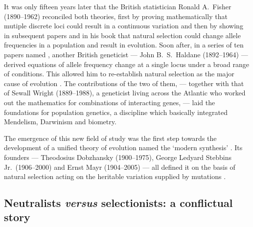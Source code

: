 It was only fifteen years later that the British statistician Ronald A.\ Fisher (1890--1962) reconciled both theories, first by proving mathematically that mutiple discrete loci could result in a continuous variation \citep{fisher1919xv} and then by showing in subsequent papers and in his book \textit{} \citeyearpar{fisher1930genetical} that natural selection could change allele frequencies in a population and result in evolution.
Soon after, in a series of ten papers named \textit{} \citeyearpar{haldane1927mathematical}, another British geneticist — John B.\ S.\ Haldane (1892--1964) — derived equations of allele frequency change at a single locus under a broad range of conditions.
This allowed him to re-establish natural selection as the major cause of evolution \citep{haldane1932causes}.
The contributions of the two of them, — together with that of Sewall Wright (1889--1988), a geneticist living across the Atlantic who worked out the mathematics for combinations of interacting genes, — laid the foundations for population genetics, a discipline which basically integrated Mendelism, Darwinism and biometry.

The emergence of this new field of study was the first step towards the development of a unified theory of evolution named the ‘modern synthesis’ \citep{huxley1942evolution}. 
Its founders — Theodosius Dobzhansky (1900--1975), George Ledyard Stebbins Jr.\ (1906--2000) and Ernst Mayr (1904--2005) — all defined it on the basis of natural selection acting on the heritable variation supplied by mutations \citep{mayr1959where,stebbins1966processes,dobzhansky1974chance}.


\subsection{Neutralists \textit{versus} selectionists: a conflictual story}

